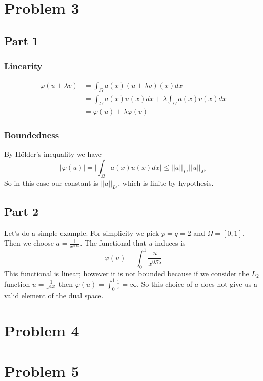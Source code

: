 \documentclass{article}
\begin{document}
\section*{Problem 3}
\subsection*{Part 1}
\subsubsection*{Linearity}
\begin{align*}
	\varphi(u+\lambda v) &= \int_\Omega a(x)(u+\lambda v)(x)dx\\
	         &= \int_\Omega a(x)u(x)dx + \lambda\int_\Omega a(x)v(x)dx\\
		 &= \varphi(u) + \lambda \varphi(v)
\end{align*}
\subsubsection*{Boundedness}
By H\"older's inequality we have
\[
	|\varphi(u)|=\bigg|\int_\Omega a(x)u(x)dx\bigg|\leq ||a||_{L^q}||u||_{L^p}
\]
So in this case our constant is $||a||_{L^q}$, which is finite by hypothesis.
\subsection*{Part 2}
Let's do a simple example. For simplicity we pick $p=q=2$ and $\Omega = [0,1]$.
Then we choose $a=\frac{1}{x^{0.75}}$. The functional that $u$ induces is
\[
	\varphi(u)=\int_0^1 \frac{u}{x^{0.75}}
\]
This functional is linear; however it is not bounded because if we consider the
$L_2$ function $u=\frac{1}{x^{0.25}}$ then $\varphi(u)=\int_0^1
\frac{1}{x}=\infty$. So this choice of $a$ does not give us a valid element of
the dual space.
\section*{Problem 4}
\section*{Problem 5}
\end{document}

